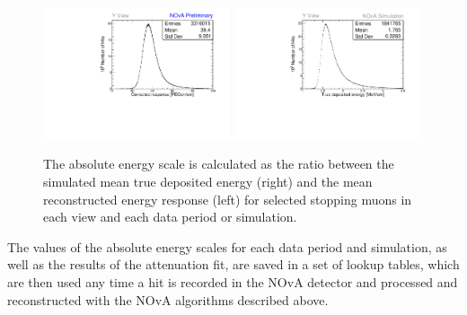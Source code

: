\begin{figure}
    \centering
    \includegraphics[width=0.49\textwidth]{Plots/NOvAExperiment/ExampleAbsCalib_P4_meu_y.pdf}
    \includegraphics[width=0.49\textwidth]{Plots/NOvAExperiment/ExampleAbsCalib_Sim_mev_y.pdf}
    \caption[Example distributions for the NOvA absolute calibration]{The absolute energy scale is calculated as the ratio between the simulated mean true deposited energy (right) and the mean reconstructed energy response (left) for selected stopping muons in each view and each data period or simulation.}
    \label{fig:NOvACalibrationAbsoluteEnergyScale}
\end{figure}


The values of the absolute energy scales for each data period and simulation, as well as the results of the attenuation fit, are saved in a set of lookup tables, which are then used any time a hit is recorded in the \gls{NOvA} detector and processed and reconstructed with the \gls{NOvA} algorithms described above.


